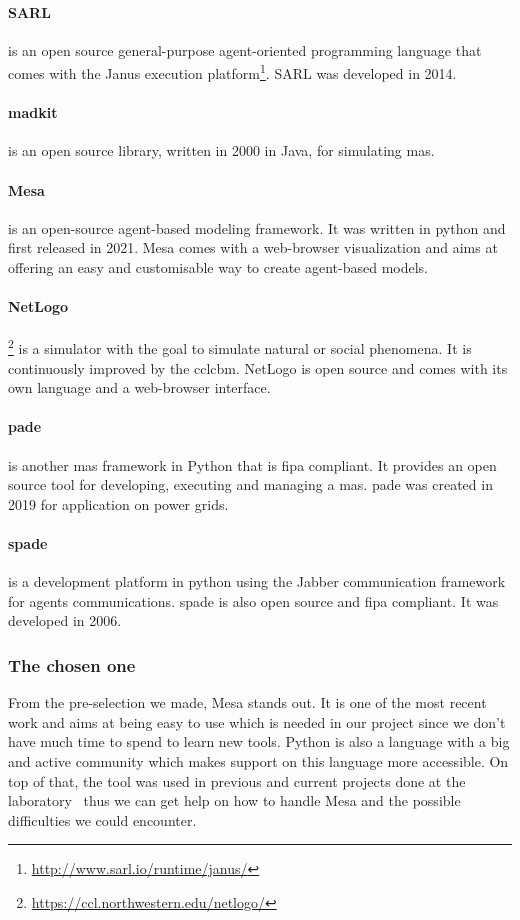 \documentclass[12pt]{report}
\begin{document}
\paragraph{SARL~\cite{rodrigez_sarl_2014}} is an open source general-purpose agent-oriented programming language that comes with the Janus execution platform\footnote{\href{http://www.sarl.io/runtime/janus/}{http://www.sarl.io/runtime/janus/}}. SARL was developed in 2014.
\paragraph{\gls{madkit}~\cite{gutknecht_madkit_2000}} is an open source library, written in 2000 in Java, for simulating \gls{mas}.
\paragraph{Mesa~\cite{kazil_mesa_2020}} is an open-source agent-based modeling framework. It was written in python and first released in 2021. Mesa comes with a web-browser visualization and aims at offering an easy and customisable way to create agent-based models.
\paragraph{NetLogo}\footnote{\href{https://ccl.northwestern.edu/netlogo/}{https://ccl.northwestern.edu/netlogo/}} is a simulator with the goal to simulate natural or social phenomena. It is continuously improved by the \gls{cclcbm}. NetLogo is open source and comes with its own language and a web-browser interface.
\paragraph{\gls{pade}~\cite{melo_pade_2019}} is another \gls{mas} framework in Python that is \gls{fipa} compliant. It provides an open source tool for developing, executing and managing a \gls{mas}. \gls{pade} was created in 2019 for application on power grids.
\paragraph{\gls{spade}~\cite{gregori_spade_2006}} is a development platform in python using the Jabber communication framework for agents communications. \gls{spade} is also open source and \gls{fipa} compliant. It was developed in 2006.

\subsubsection{The chosen one}
From the pre-selection we made, Mesa stands out. It is one of the most recent work and aims at being easy to use which is needed in our project since we don't have much time to spend to learn new tools. Python is also a language with a big and active community which makes support on this language more accessible. On top of that, the tool was used in previous and current projects done at the laboratory~\cite{bonnet_adrian_securisation_nodate} thus we can get help on how to handle Mesa and the possible difficulties we could encounter.
\end{document}
